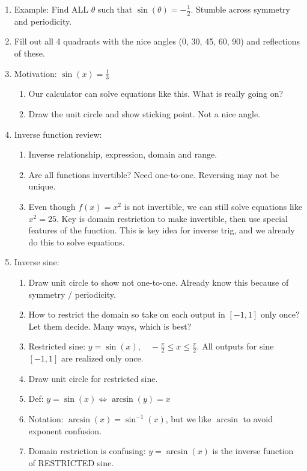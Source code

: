 \documentclass{article}
\begin{document}
\begin{enumerate}
\item Example: Find ALL $\theta$ such that $\sin(\theta) = -\frac{1}{2}$. Stumble across symmetry and periodicity.

\item Fill out all 4 quadrants with the nice angles (0, 30, 45, 60, 90) and reflections of these.

\item Motivation: $\sin(x)=\frac{1}{3}$
\begin{enumerate}
\item Our calculator can solve equations like this. What is really going on?
\item Draw the unit circle and show sticking point. Not a nice angle. 
\end{enumerate}

\item Inverse function review: 
\begin{enumerate}
\item Inverse relationship, expression, domain and range.
\item Are all functions invertible? Need one-to-one. Reversing may not be unique.
\item Even though $f(x)=x^2$ is not invertible, we can still solve equations like $x^2=25$. Key is domain restriction to make invertible, then use special features of the function. This is key idea for inverse trig, and we already do this to solve equations.
\end{enumerate}

\item Inverse sine:
\begin{enumerate}
\item Draw unit circle to show not one-to-one. Already know this because of symmetry / periodicity.
\item How to restrict the domain so take on each output in $[-1,1]$ only once? Let them decide. Many ways, which is best?
\item Restricted sine: $y=\sin(x), \quad -\frac{\pi}{2}\leq x \leq \frac{\pi}{2}$. All outputs for sine $[-1,1]$ are realized only once.
\item Draw unit circle for restricted sine.
\item Def: $y = \sin(x) \Leftrightarrow \arcsin(y)=x$
\item Notation: $\arcsin(x)=\sin^{-1}(x)$, but we like $\arcsin$ to avoid exponent confusion.
\item Domain restriction is confusing: $y = \arcsin(x)$ is the inverse function of RESTRICTED sine.
\end{enumerate}


\end{enumerate}
\end{document}

